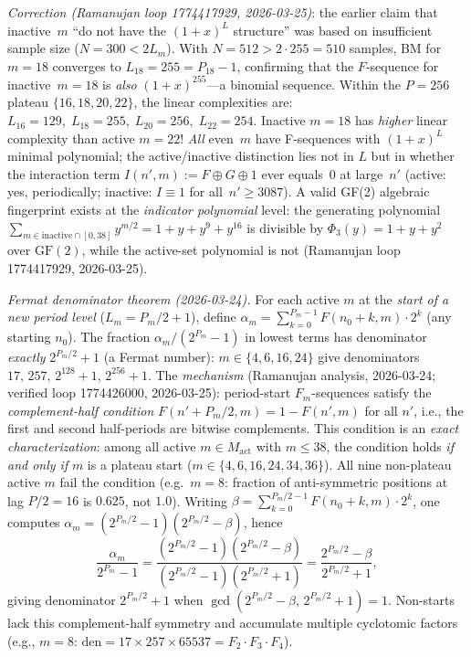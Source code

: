 \documentclass[11pt]{article}
\theoremstyle{plain}
\theoremstyle{definition}
\begin{document}
\emph{Correction (Ramanujan loop 1774417929, 2026-03-25)}: the earlier claim
that inactive~$m$ ``do not have the $(1+x)^L$ structure'' was based on insufficient
sample size ($N=300 < 2L_m$).  With $N=512 > 2\cdot 255 = 510$ samples,
BM for $m=18$ converges to $L_{18} = 255 = P_{18}-1$, confirming that the $F$-sequence
for inactive~$m=18$ is \emph{also} $(1+x)^{255}$---a binomial sequence.
Within the $P=256$ plateau $\{16,18,20,22\}$, the linear complexities are:
$L_{16}=129,\; L_{18}=255,\; L_{20}=256,\; L_{22}=254$.
Inactive $m=18$ has \emph{higher} linear complexity than active $m=22$!
\emph{All} even~$m$ have F-sequences with $(1+x)^L$ minimal polynomial;
the active/inactive distinction lies not in $L$
but in whether the interaction term $I(n',m) := F\oplus G\oplus 1$ ever equals~$0$
at large~$n'$ (active: yes, periodically; inactive: $I\equiv 1$ for all~$n'\geq 3087$).
A valid GF(2) algebraic fingerprint exists at the \emph{indicator polynomial} level:
the generating polynomial $\sum_{m\in \mathrm{inactive}\cap[0,38]} y^{m/2}
= 1+y+y^9+y^{16}$ is divisible by $\Phi_3(y)=1+y+y^2$ over $\mathrm{GF}(2)$,
while the active-set polynomial is not (Ramanujan loop 1774417929, 2026-03-25).

\emph{Fermat denominator theorem (2026-03-24).}
For each active $m$ at the \emph{start of a new period level} ($L_m = P_m/2 + 1$),
define $\alpha_m = \sum_{k=0}^{P_m-1} F(n_0+k,m)\cdot 2^k$ (any starting $n_0$).
The fraction $\alpha_m/(2^{P_m}-1)$ in lowest terms has denominator
\emph{exactly} $2^{P_m/2}+1$ (a Fermat number):
$m \in \{4,6,16,24\}$ give denominators $17,\,257,\,2^{128}+1,\,2^{256}+1$.
The \emph{mechanism} (Ramanujan analysis, 2026-03-24; verified loop 1774426000, 2026-03-25):
period-start $F_m$-sequences satisfy
the \emph{complement-half condition} $F(n'+P_m/2,m) = 1 - F(n',m)$ for all $n'$,
i.e., the first and second half-periods are bitwise complements.
This condition is an \emph{exact characterization}: among all active $m\in M_{\mathrm{act}}$
with $m\le 38$, the condition holds \emph{if and only if} $m$ is a plateau start
($m\in\{4,6,16,24,34,36\}$).  All nine non-plateau active $m$ fail the condition
(e.g.\ $m=8$: fraction of anti-symmetric positions at lag $P/2=16$ is $0.625$, not $1.0$).
Writing $\beta = \sum_{k=0}^{P_m/2-1} F(n_0+k,m)\cdot 2^k$, one computes
$\alpha_m = (2^{P_m/2}-1)(2^{P_m/2}-\beta)$, hence
\[
  \frac{\alpha_m}{2^{P_m}-1} = \frac{(2^{P_m/2}-1)(2^{P_m/2}-\beta)}{(2^{P_m/2}-1)(2^{P_m/2}+1)}
  = \frac{2^{P_m/2}-\beta}{2^{P_m/2}+1},
\]
giving denominator $2^{P_m/2}+1$ when $\gcd(2^{P_m/2}-\beta,\,2^{P_m/2}+1)=1$.
Non-starts lack this complement-half symmetry and accumulate multiple cyclotomic factors
(e.g., $m=8$: $\mathrm{den} = 17\times 257\times 65537 = F_2\cdot F_3\cdot F_4$).
\end{document}
